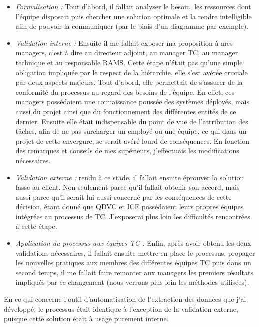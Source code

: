 \begin{itemize}
\item \textit{Formalisation :} Tout d'abord, il fallait analyser le besoin, les ressources dont l'équipe disposait puis chercher une solution optimale et la rendre intelligible afin de pouvoir la communiquer (par le biais d'un diagramme par exemple).
\item \textit{Validation interne :} Ensuite il me fallait exposer ma proposition à mes managers, c'est à dire au directeur adjoint, au manager \gls{TC}, au manager technique et au responsable \gls{RAMS}. Cette étape n'était pas qu'une simple obligation impliquée par le respect de la hiérarchie, elle s'est avérée cruciale par deux aspects majeurs. Tout d'abord, elle permettait de s'assurer de la conformité du processus au regard des besoins de l'équipe. En effet, ces managers possédaient une connaissance poussée des systèmes déployés, mais aussi du projet ainsi que du fonctionnement des différentes entités de ce dernier. Ensuite elle était indispensable du point de vue de l'attribution des tâches, afin de ne pas surcharger un employé ou une équipe, ce qui dans un projet de cette envergure, se serait avéré lourd de conséquences. En fonction des remarques et conseils de mes supérieurs, j'effectuais les modifications nécessaires.
\item \textit{Validation externe :} rendu à ce stade, il fallait ensuite éprouver la solution fasse au client. Non seulement parce qu'il fallait obtenir son accord, mais aussi parce qu'il serait lui aussi concerné par les conséquences de cette décision, étant donné que QDVC et ICE possédaient leurs propres équipes intégrées au processus de \gls{TC}. J'exposerai plus loin les difficultés rencontrées à cette étape.
\item \textit{Application du processus aux équipes \gls{TC} :} Enfin, après avoir obtenu les deux validations nécessaires, il fallait ensuite mettre en place le processus, propager les nouvelles pratiques aux membres des différentes équipes \gls{TC} puis dans un second temps, il me fallait faire remonter aux managers les premiers résultats impliqués par ce changement (nous verrons plus loin les méthodes utilisées).
\end{itemize}

En ce qui concerne l'outil d'automatisation de l'extraction des données que j'ai développé, le processus était identique à l'exception de la validation externe, puisque cette solution était à usage purement interne.

